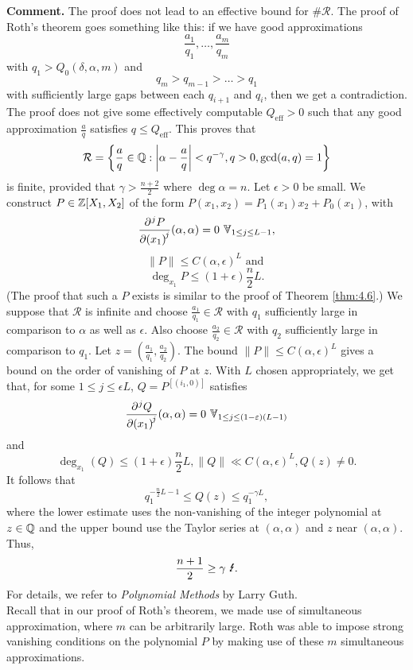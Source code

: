 \documentclass{Vorlesungstemplate_English} %
\begin{document}
\noindent\textbf{Comment.} The proof does not lead to an effective bound for $\#\mathcal R$. The proof of Roth's theorem goes something like this: if we have good approximations
\[
  \frac{a_1}{q_1},\dots,\frac{a_m}{q_m}
\]
with $q_1>Q_0(\delta,\alpha,m)$ and
\[
  q_m>q_{m-1}>\dots>q_1
\]
with sufficiently large gaps between each $q_{i+1}$ and $q_i$, then we get a contradiction. The proof does not give some effectively computable $Q_{\mathrm{eff}}>0$ such that any good approximation $\frac aq$ satisfies $q\leq Q_{\mathrm{eff}}$.
This proves that
\[ \mathcal R = \left\{ \frac{a}{q} \in \mathbb{Q}: \left| \alpha - \frac{a}{q}\right| < q^{-\gamma}, q > 0, \gcd(a,q) = 1\right\}\]
is finite, provided that $\gamma > \frac{n+2}{2}$ where $\deg\alpha = n$. Let $\epsilon > 0$ be small. We construct $P \in \mathbb{Z}[X_1, X_2]$ of the form $P(x_1, x_2) = P_1(x_1)x_2 + P_0(x_1)$, with
\[ \diffp[j]{P}{x_1}(\alpha, \alpha) = 0 \forall_{1 \leq j \leq L-1},\]
\[ \| P \| \leq C(\alpha, \epsilon)^L \text{ and }\]
\[ \deg_{x_1}P \leq (1+\epsilon)\frac{n}{2}L.\]
(The proof that such a $P$ exists is similar to the proof of Theorem \ref{thm:4.6}.) We suppose that $\mathcal R$ is infinite and choose $\frac{a_1}{q_1} \in \mathcal R$ with $q_1$ sufficiently large in comparison to $\alpha$ as well as $\epsilon$. Also choose $\frac{a_2}{q_2} \in \mathcal R$ with $q_2$ sufficiently large in comparison to $q_1$. Let $z = \left(\frac{a_1}{q_1}, \frac{a_2}{q_2}\right)$. The bound $\| P \| \leq C(\alpha, \epsilon)^L$ gives a bound on the order of vanishing of $P$ at $z$. With $L$ chosen appropriately, we get that, for some $1 \leq j \leq \epsilon L$, $Q = P^{[(i_1,0)]}$ satisfies
\[ \diffp[j]{Q}{x_1}(\alpha, \alpha) = 0 \forall_{1 \leq j \leq (1-\epsilon)(L-1)}\]
and
\[ \deg_{x_1}(Q) \leq (1+\epsilon)\frac{n}{2}L, \|Q\| \ll C(\alpha, \epsilon)^L, Q(z) \neq 0.\]
It follows that
\[ q_1^{-\frac{n}{2}L-1} \leq Q(z) \leq q_1^{-\gamma L},\]
where the lower estimate uses the non-vanishing of the integer polynomial at $z \in \mathbb{Q}$ and the upper bound use the Taylor series at $(\alpha,\alpha)$ and $z$ near $(\alpha,\alpha)$. Thus,
\[ \frac{n+1}{2} \geq \gamma \text{ \Lightning.}\]
For details, we refer to \emph{Polynomial Methods}\autocite{guth16} by Larry Guth. \\
Recall that in our proof of Roth's theorem, we made use of simultaneous approximation, where $m$ can be arbitrarily large. Roth was able to impose strong vanishing conditions on the polynomial $P$ by making use of these $m$ simultaneous approximations.
\end{document}
